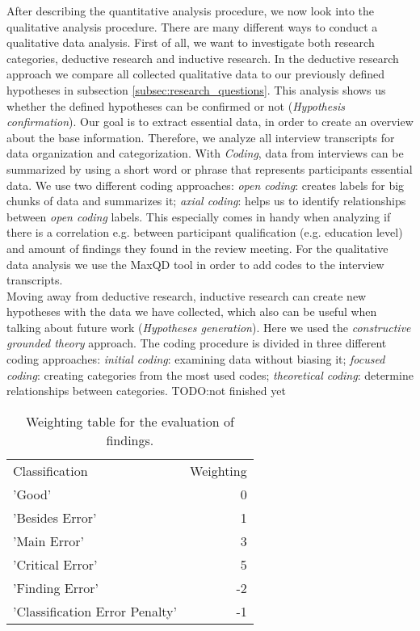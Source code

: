 After describing the quantitative analysis procedure, we now look into the qualitative analysis procedure.
There are many different ways to conduct a qualitative data analysis. First of all, we want to investigate both research categories, deductive research and inductive research.
In the deductive research approach we compare all collected qualitative data to our previously defined hypotheses in subsection \ref{subsec:research_questions}. This analysis shows us whether the defined hypotheses can be confirmed or not (\textit{Hypothesis confirmation}). Our goal is to extract essential data, in order to create an overview about the base information. Therefore, we analyze all interview transcripts for data organization and categorization. With \textit{Coding}, data from interviews can be summarized by using a short word or phrase that represents participants essential data. We use two different coding approaches: \textit{open coding}: creates labels for big chunks of data and summarizes it; \textit{axial coding}: helps us to identify relationships between \textit{open coding} labels. This especially comes in handy when analyzing if there is a correlation e.g. between participant qualification (e.g. education level) and amount of findings they found in the review meeting. For the qualitative data analysis we use the MaxQD tool in order to add codes to the interview transcripts. \\
Moving away from deductive research, inductive research can create new hypotheses with the data we have collected, which also can be useful when talking about future work (\textit{Hypotheses generation}). Here we used the \textit{constructive grounded theory} approach. The coding procedure is divided in three different coding approaches: \textit{initial coding}: examining data without biasing it; \textit{focused coding}: creating categories from the most used codes; \textit{theoretical coding}: determine relationships between categories.
TODO:not finished yet

\begin{table}
\centering
\begin{tabular}{lr}
  \rowcolor{heading}Classification & Weighting \\
  \rowcolor{a}'Good' & 0 \\
  \rowcolor{b}'Besides Error' & 1 \\
  \rowcolor{a}'Main Error' & 3 \\
  \rowcolor{b}'Critical Error' & 5 \\
  \rowcolor{a}'Finding Error' & -2 \\
  \rowcolor{b}'Classification Error Penalty' & -1 \\
\end{tabular}
\caption{Weighting table for the evaluation of findings.}
\label{tab:ratings}
\end{table}

